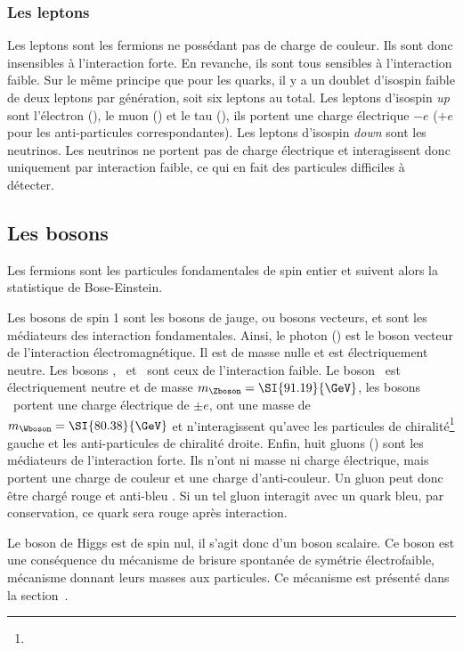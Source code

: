 \subsubsection{Les leptons}\label{chapter-MS-MSSM-section-SM_ptcs-subsec-fermions-subsubsec-leptons}
Les leptons sont les fermions ne possédant pas de charge de couleur. Ils sont donc insensibles à l'interaction forte. En revanche, ils sont tous sensibles à l'interaction faible.
Sur le même principe que pour les quarks, il y a un doublet d'isospin faible de deux leptons par génération, soit six leptons au total.
Les leptons d'isospin \emph{up} sont l'électron (\electron), le muon (\muon) et le tau (\leptau), ils portent une charge électrique $-e$ ($+e$ pour les anti-particules correspondantes). Les leptons d'isospin \emph{down} sont les neutrinos. Les neutrinos ne portent pas de charge électrique et interagissent donc uniquement par interaction faible, ce qui en fait des particules difficiles à détecter.


\subsection{Les bosons}\label{chapter-MS-MSSM-section-SM_ptcs-subsec-bosons}
Les fermions sont les particules fondamentales de spin entier et suivent alors la statistique de Bose-Einstein.
\par Les bosons de spin 1 sont les bosons de jauge, ou bosons vecteurs, et sont les médiateurs des interaction fondamentales.
Ainsi, le photon (\photon) est le boson vecteur de l'interaction électromagnétique. Il est de masse nulle et est électriquement neutre.
Les bosons \Wbosonplus, \Wbosonminus\ et \Zboson\ sont ceux de l'interaction faible. Le boson \Zboson\ est électriquement neutre et de masse $m_\Zboson=\SI{91.19}{\GeV}$, les bosons \Wboson\ portent une charge électrique de $\pm e$, ont une masse de $m_\Wboson=\SI{80.38}{\GeV}$ et n'interagissent qu'avec les particules de chiralité\footnote{} gauche et les anti-particules de chiralité droite.
Enfin, huit gluons (\gluon) sont les médiateurs de l'interaction forte. Ils n'ont ni masse ni charge électrique, mais portent une charge de couleur et une charge d'anti-couleur. Un gluon peut donc être chargé \og rouge et anti-bleu \fg{}. Si un tel gluon interagit avec un quark bleu, par conservation, ce quark sera rouge après interaction.
\par Le boson de Higgs est de spin nul, il s'agit donc d'un boson scalaire. Ce boson est une conséquence du mécanisme de brisure spontanée de symétrie électrofaible, mécanisme donnant leurs masses aux particules. Ce mécanisme est présenté dans la section~.

%
%
